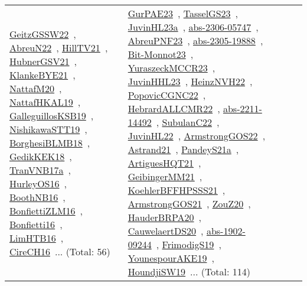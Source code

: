 {\begin{longtable}{lp{3cm}>{\raggedright\arraybackslash}p{6cm}>{\raggedright\arraybackslash}p{6cm}>{\raggedright\arraybackslash}p{8cm}}
\href{../works/GeitzGSSW22.pdf}{GeitzGSSW22}~\cite{GeitzGSSW22}, \href{../works/AbreuN22.pdf}{AbreuN22}~\cite{AbreuN22}, \href{../works/HillTV21.pdf}{HillTV21}~\cite{HillTV21}, \href{../works/HubnerGSV21.pdf}{HubnerGSV21}~\cite{HubnerGSV21}, \href{../works/KlankeBYE21.pdf}{KlankeBYE21}~\cite{KlankeBYE21}, \href{../works/NattafM20.pdf}{NattafM20}~\cite{NattafM20}, \href{../works/NattafHKAL19.pdf}{NattafHKAL19}~\cite{NattafHKAL19}, \href{../works/GalleguillosKSB19.pdf}{GalleguillosKSB19}~\cite{GalleguillosKSB19}, \href{../works/NishikawaSTT19.pdf}{NishikawaSTT19}~\cite{NishikawaSTT19}, \href{../works/BorghesiBLMB18.pdf}{BorghesiBLMB18}~\cite{BorghesiBLMB18}, \href{../works/GedikKEK18.pdf}{GedikKEK18}~\cite{GedikKEK18}, \href{../works/TranVNB17a.pdf}{TranVNB17a}~\cite{TranVNB17a}, \href{../works/HurleyOS16.pdf}{HurleyOS16}~\cite{HurleyOS16}, \href{../works/BoothNB16.pdf}{BoothNB16}~\cite{BoothNB16}, \href{../works/BonfiettiZLM16.pdf}{BonfiettiZLM16}~\cite{BonfiettiZLM16}, \href{../works/Bonfietti16.pdf}{Bonfietti16}~\cite{Bonfietti16}, \href{../works/LimHTB16.pdf}{LimHTB16}~\cite{LimHTB16}, \href{../works/CireCH16.pdf}{CireCH16}~\cite{CireCH16}... (Total: 56) & \href{../works/GurPAE23.pdf}{GurPAE23}~\cite{GurPAE23}, \href{../works/TasselGS23.pdf}{TasselGS23}~\cite{TasselGS23}, \href{../works/JuvinHL23a.pdf}{JuvinHL23a}~\cite{JuvinHL23a}, \href{../works/abs-2306-05747.pdf}{abs-2306-05747}~\cite{abs-2306-05747}, \href{../works/AbreuPNF23.pdf}{AbreuPNF23}~\cite{AbreuPNF23}, \href{../works/abs-2305-19888.pdf}{abs-2305-19888}~\cite{abs-2305-19888}, \href{../works/Bit-Monnot23.pdf}{Bit-Monnot23}~\cite{Bit-Monnot23}, \href{../works/YuraszeckMCCR23.pdf}{YuraszeckMCCR23}~\cite{YuraszeckMCCR23}, \href{../works/JuvinHHL23.pdf}{JuvinHHL23}~\cite{JuvinHHL23}, \href{../works/HeinzNVH22.pdf}{HeinzNVH22}~\cite{HeinzNVH22}, \href{../works/PopovicCGNC22.pdf}{PopovicCGNC22}~\cite{PopovicCGNC22}, \href{../works/HebrardALLCMR22.pdf}{HebrardALLCMR22}~\cite{HebrardALLCMR22}, \href{../works/abs-2211-14492.pdf}{abs-2211-14492}~\cite{abs-2211-14492}, \href{../works/SubulanC22.pdf}{SubulanC22}~\cite{SubulanC22}, \href{../works/JuvinHL22.pdf}{JuvinHL22}~\cite{JuvinHL22}, \href{../works/ArmstrongGOS22.pdf}{ArmstrongGOS22}~\cite{ArmstrongGOS22}, \href{../works/Astrand21.pdf}{Astrand21}~\cite{Astrand21}, \href{../works/PandeyS21a.pdf}{PandeyS21a}~\cite{PandeyS21a}, \href{../works/ArtiguesHQT21.pdf}{ArtiguesHQT21}~\cite{ArtiguesHQT21}, \href{../works/GeibingerMM21.pdf}{GeibingerMM21}~\cite{GeibingerMM21}, \href{../works/KoehlerBFFHPSSS21.pdf}{KoehlerBFFHPSSS21}~\cite{KoehlerBFFHPSSS21}, \href{../works/ArmstrongGOS21.pdf}{ArmstrongGOS21}~\cite{ArmstrongGOS21}, \href{../works/ZouZ20.pdf}{ZouZ20}~\cite{ZouZ20}, \href{../works/HauderBRPA20.pdf}{HauderBRPA20}~\cite{HauderBRPA20}, \href{../works/CauwelaertDS20.pdf}{CauwelaertDS20}~\cite{CauwelaertDS20}, \href{../works/abs-1902-09244.pdf}{abs-1902-09244}~\cite{abs-1902-09244}, \href{../works/FrimodigS19.pdf}{FrimodigS19}~\cite{FrimodigS19}, \href{../works/YounespourAKE19.pdf}{YounespourAKE19}~\cite{YounespourAKE19}, \href{../works/HoundjiSW19.pdf}{HoundjiSW19}~\cite{HoundjiSW19}... (Total: 114)\\

\end{longtable}}
